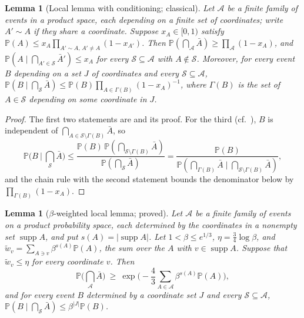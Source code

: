 \documentclass[11pt,reqno]{amsart}
\newtheorem{lemma}[theorem]{Lemma}
\theoremstyle{definition}
\newcommand{\PP}{\mathbb P}
\newcommand{\supp}{\operatorname{supp}}
\begin{document}
\begin{lemma}[Local lemma with conditioning; classical]\label{lem:lll}
Let $\mathcal A$ be a finite family of events in a product space, each
depending on a finite set of coordinates; write $A'\sim A$ if they share a
coordinate.  Suppose $x_A\in[0,1)$ satisfy
$\PP(A)\le x_A\prod_{A'\sim A,\,A'\ne A}(1-x_{A'})$.  Then
$\PP(\bigcap_{\mathcal A}\bar A)\ge\prod_{\mathcal A}(1-x_A)$, and
$\PP(A\mid\bigcap_{A'\in\mathcal S}\bar A')\le x_A$ for every
$\mathcal S\subseteq\mathcal A$ with $A\notin\mathcal S$.  Moreover, for every
event $B$ depending on a set $J$ of coordinates and every
$\mathcal S\subseteq\mathcal A$,
$\PP(B\mid\bigcap_{\mathcal S}\bar A)\le\PP(B)\prod_{A\in\Gamma(B)}(1-x_A)^{-1}$, where
$\Gamma(B)$ is the set of $A\in\mathcal S$ depending on some coordinate in $J$.
\end{lemma}

\begin{proof}
The first two statements are \cite[Lemma~5.1.1]{AS} and its proof.  For the
third (cf.\ \cite[Thm.~2.1]{HSS}), $B$ is independent of
$\bigcap_{A\in\mathcal S\setminus\Gamma(B)}\bar A$, so
\[
 \PP\Big(B\ \Big|\ \bigcap_{\mathcal S}\bar A\Big)
 \le\frac{\PP(B)\,\PP(\bigcap_{\mathcal S\setminus\Gamma(B)}\bar A)}{\PP(\bigcap_{\mathcal S}\bar A)}
 =\frac{\PP(B)}{\PP(\bigcap_{\Gamma(B)}\bar A\mid\bigcap_{\mathcal S\setminus\Gamma(B)}\bar A)},
\]
and the chain rule with the second statement bounds the denominator below by
$\prod_{\Gamma(B)}(1-x_A)$.
\end{proof}

\begin{lemma}[$\beta$-weighted local lemma; proved]\label{lem:betalll}
Let $\mathcal A$ be a finite family of events on a product probability
space, each determined by the coordinates in a nonempty set $\supp A$, and
put $s(A)=|\supp A|$.  Let $1<\beta\le e^{1/3}$, $\eta=\frac34\log\beta$, and
$\tilde w_v=\sum_{A\ni v}\beta^{s(A)}\PP(A)$, the sum over the $A$ with
$v\in\supp A$.  Suppose that $\tilde w_v\le\eta$ for every coordinate $v$.
Then
\[
 \PP\Big(\bigcap_{\mathcal A}\bar A\Big)\ \ge\ \exp\Big(-\frac43\sum_{A\in\mathcal A}\beta^{s(A)}\PP(A)\Big),
\]
and for every event $B$ determined by a coordinate set $J$ and every
$\mathcal S\subseteq\mathcal A$,
$\PP(B\mid\bigcap_{\mathcal S}\bar A)\le\beta^{|J|}\PP(B)$.
\end{lemma}
\end{document}
